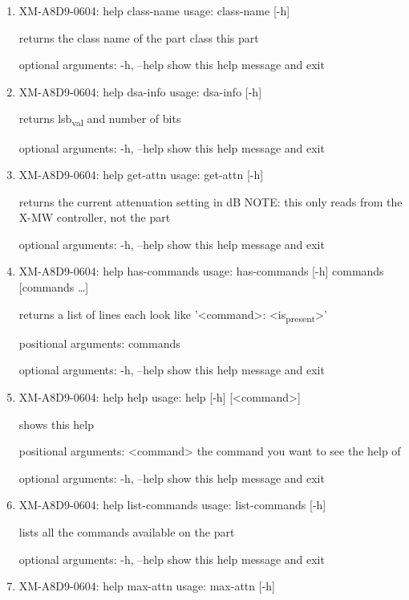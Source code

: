 \documentclass[11pt]{article}
\begin{document}
\begin{enumerate}
\item XM-A8D9-0604: help class-name
\label{sec:org3d1cc81}
usage: class-name [-h]

returns the class name of the part class this part

optional arguments:
  -h, --help  show this help message and exit

\item XM-A8D9-0604: help dsa-info
\label{sec:orgb0c57c3}
usage: dsa-info [-h]

returns lsb\textsubscript{val} and number of bits

optional arguments:
  -h, --help  show this help message and exit

\item XM-A8D9-0604: help get-attn
\label{sec:org0cc33a0}
usage: get-attn [-h]

returns the current attenuation setting in dB NOTE: this only reads from the
X-MW controller, not the part

optional arguments:
  -h, --help  show this help message and exit

\item XM-A8D9-0604: help has-commands
\label{sec:org64bb070}
usage: has-commands [-h] commands [commands \ldots{}]

returns a list of lines each look like '<command>: <is\textsubscript{present}>'

positional arguments:
  commands

optional arguments:
  -h, --help  show this help message and exit

\item XM-A8D9-0604: help help
\label{sec:org9e702db}
usage: help [-h] [<command>]

shows this help

positional arguments:
  <command>   the command you want to see the help of

optional arguments:
  -h, --help  show this help message and exit

\item XM-A8D9-0604: help list-commands
\label{sec:orgdba614b}
usage: list-commands [-h]

lists all the commands available on the part

optional arguments:
  -h, --help  show this help message and exit

\item XM-A8D9-0604: help max-attn
\label{sec:org2e02bb2}
usage: max-attn [-h]


\end{enumerate}
\end{document}
